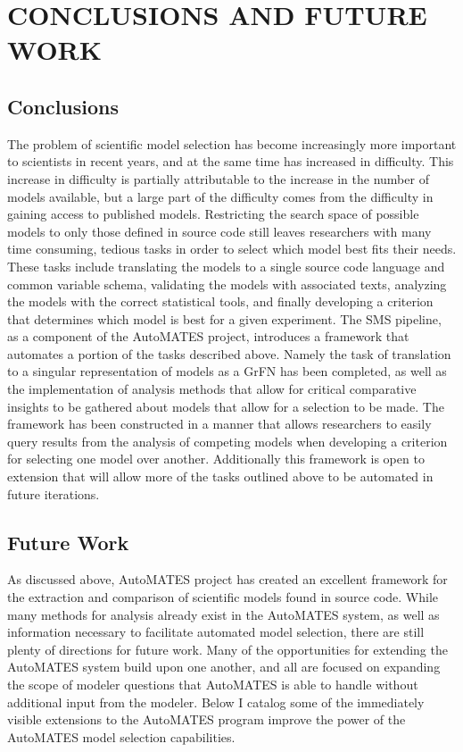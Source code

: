 \chapter{CONCLUSIONS AND FUTURE WORK\label{chapter:conc_and_future}}

\section{Conclusions\label{sec:conclusions}}
The problem of scientific model selection has become increasingly more important to scientists in recent years, and at the same time has increased in difficulty.
This increase in difficulty is partially attributable to the increase in the number of models available, but a large part of the difficulty comes from the difficulty in gaining access to published models.
Restricting the search space of possible models to only those defined in source code still leaves researchers with many time consuming, tedious tasks in order to select which model best fits their needs.
These tasks include translating the models to a single source code language and common variable schema, validating the models with associated texts, analyzing the models with the correct statistical tools, and finally developing a criterion that determines which model is best for a given experiment.
The SMS pipeline, as a component of the AutoMATES project, introduces a framework that automates a portion of the tasks described above.
Namely the task of translation to a singular representation of models as a GrFN has been completed, as well as the implementation of analysis methods that allow for critical comparative insights to be gathered about models that allow for a selection to be made.
The framework has been constructed in a manner that allows researchers to easily query results from the analysis of competing models when developing a criterion for selecting one model over another.
Additionally this framework is open to extension that will allow more of the tasks outlined above to be automated in future iterations.

\section{Future Work\label{sec:future_work}}
As discussed above, AutoMATES project has created an excellent framework for the extraction and comparison of scientific models found in source code. While many methods for analysis already exist in the AutoMATES system, as well as information necessary to facilitate automated model selection, there are still plenty of directions for future work. Many of the opportunities for extending the AutoMATES system build upon one another, and all are focused on expanding the scope of modeler questions that AutoMATES is able to handle without additional input from the modeler. Below I catalog some of the immediately visible extensions to the AutoMATES program improve the power of the AutoMATES model selection capabilities.

